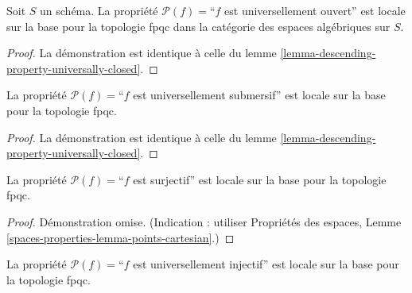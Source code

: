 \begin{lemma}
\label{lemma-descending-property-universally-open}
Soit $S$ un schéma.
La propriété $\mathcal{P}(f) =$``$f$ est universellement ouvert''
est locale sur la base pour la topologie fpqc dans la catégorie des espaces algébriques sur $S$.
\end{lemma}

\begin{proof}
La démonstration est identique à celle du
lemme \ref{lemma-descending-property-universally-closed}.
\end{proof}

\begin{lemma}
\label{lemma-descending-property-universally-submersive}
La propriété $\mathcal{P}(f) =$``$f$ est universellement submersif''
est locale sur la base pour la topologie fpqc.
\end{lemma}

\begin{proof}
La démonstration est identique à celle du
lemme \ref{lemma-descending-property-universally-closed}.
\end{proof}

\begin{lemma}
\label{lemma-descending-property-surjective}
La propriété $\mathcal{P}(f) =$``$f$ est surjectif''
est locale sur la base pour la topologie fpqc.
\end{lemma}

\begin{proof}
Démonstration omise. (Indication : utiliser
Propriétés des espaces, Lemme \ref{spaces-properties-lemma-points-cartesian}.)
\end{proof}

\begin{lemma}
\label{lemma-descending-property-universally-injective}
La propriété $\mathcal{P}(f) =$``$f$ est universellement injectif''
est locale sur la base pour la topologie fpqc.
\end{lemma}

